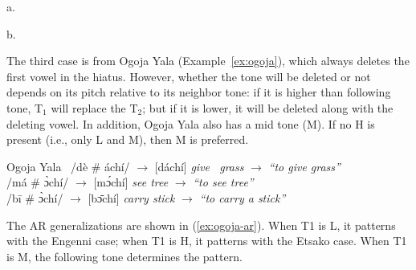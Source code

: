 \ex \label{ex:engenni-etsako}
a.~
\hfill
b.~
\hspace*{\fill}
\xe

The third case is from Ogoja Yala (Example~\ref{ex:ogoja}), which always
deletes the first vowel in the hiatus. However, whether the tone will be
deleted or not depends on its pitch relative to its neighbor tone: if it
is higher than following tone, T$_1$ will replace the T$_2$; but if it
is lower, it will be deleted along with the deleting vowel. In addition,
Ogoja Yala also has a mid tone (M). If no H is present (i.e., only L and
M), then M is preferred.

\ex Ogoja Yala
\label{ex:ogoja}
\
/dè \# áchí/ $\rightarrow$ [dáchí] \vspace{3em} \textit{give \ grass} $\rightarrow$ \textit{``to give grass''}\\
/má \# \` ɔchí/ $\rightarrow$ [m\' ɔchí] \vspace{3em}\textit{see \quad tree} $\rightarrow$ \textit{``to see tree''}\\
/b\=i \# \` ɔchí/ $\rightarrow$ [b\=ɔchí] \vspace{3em} \textit{carry  stick} $\rightarrow$ \textit{``to carry a stick''}\\

\xe

The AR generalizations are shown in (\ref{ex:ogoja-ar}). When T1 is L,
it patterns with the Engenni case; when T1 is H, it patterns with the
Etsako case. When T1 is M, the following tone determines the pattern.


